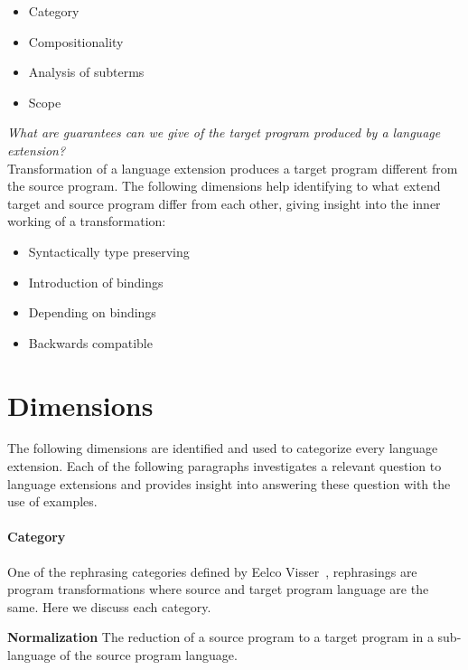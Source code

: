 \begin{itemize}
	\setlength\itemsep{0.4em}
	\item Category
	\item Compositionality
	\item Analysis of subterms
	\item Scope
\end{itemize}

\textit{What are guarantees can we give of the target program produced by a language extension?}\\
Transformation of a language extension produces a target program different from the source program. The following dimensions help identifying to what extend target and source program differ from each other, giving insight into the inner working of a transformation:

\begin{itemize}
	\item Syntactically type preserving
	\item Introduction of bindings
	\item Depending on bindings
	\item Backwards compatible
\end{itemize}

\section{Dimensions}
The following dimensions are identified and used to categorize every language extension. Each of the following paragraphs investigates a relevant question to language extensions and provides insight into answering these question with the use of examples.

\paragraph{Category}
One of the rephrasing categories defined by Eelco Visser~\cite{Visser2001}, rephrasings are program transformations where source and target program language are the same. Here we discuss each category.

\textbf{Normalization}
The reduction of a source program to a target program in a sub-language of the source program language.

